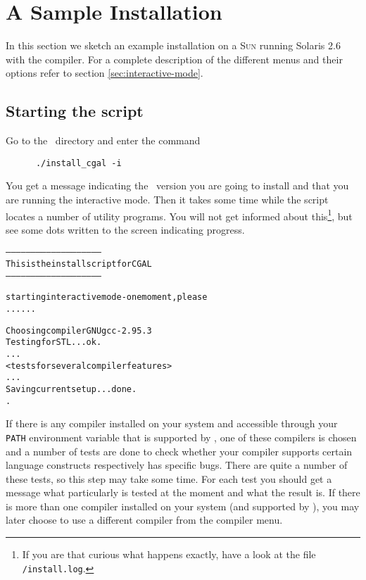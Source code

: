 \section{A Sample Installation}\label{sec:sample-inst}

In this section we sketch an example installation on a \textsc{Sun}
running Solaris 2.6 with the  compiler. For a complete
description of the different menus and their options refer to section
\ref{sec:interactive-mode}.

\subsection{Starting the script}

Go to the \cgaldir\ directory and enter the command
\begin{verbatim}
      ./install_cgal -i
\end{verbatim}

You get a message indicating the \cgal\ version you are going to
install and that you are running the interactive mode. Then it takes
some time while the script locates a number of utility programs. You
will not get informed about this\footnote{If you are that curious what
  happens exactly, have a look at the file
  \texttt{\cgaldir/install.log}.}, but see some
dots written to the screen indicating progress.

{\ccTexHtml{\scriptsize}{}
\begin{alltt}
--------------------------------------------------------
  This is the install script for CGAL \cgalrelease
--------------------------------------------------------

starting interactive mode - one moment, please
......

  Choosing compiler GNU gcc-2.95.3
  Testing for STL ... ok.
  ...
  <tests for several compiler features>
  ...
  Saving current setup ... done.
.
\end{alltt}}
  
If there is any compiler installed on your system and accessible
through your \texttt{PATH} environment variable that is supported by
\cgal, one of these compilers is chosen and a number of tests are done
to check whether your compiler supports certain language constructs
respectively has specific bugs. There are quite a number of these
tests, so this step may take some time. For each test you should get a
message what particularly is tested at the moment and what the result
is. If there is more than one compiler installed on your system (and
supported by \cgal), you may later choose to use a different compiler
from the compiler menu.

